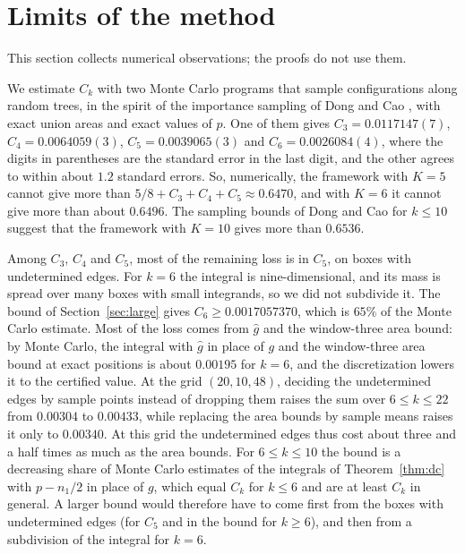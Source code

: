 \documentclass[11pt]{amsart}
\theoremstyle{definition}
\theoremstyle{remark}
\numberwithin{equation}{section}
\newcommand{\KmaxW}{22}
\newcommand{\WCsix}{0.0017057370}\newcommand{\WPctSix}{65}%
\newcommand{\Kmax}{\KmaxW}
\newcommand{\MCThree}{0.0117147}
\newcommand{\MCFour}{0.0064059}
\newcommand{\MCFive}{0.0039065}
\newcommand{\MCSix}{0.0026084}
\begin{document}
\section{Limits of the method}\label{sec:limits}

This section collects numerical observations; the proofs do not use them.

We estimate $C_k$ with two Monte Carlo programs that sample configurations along random trees, in the spirit of the importance sampling of Dong and Cao \cite[Section~3.4]{DC26}, with exact union areas and exact values of $p$. One of them gives $C_3=\MCThree(7)$, $C_4=\MCFour(3)$, $C_5=\MCFive(3)$ and $C_6=\MCSix(4)$, where the digits in parentheses are the standard error in the last digit, and the other agrees to within about $1.2$ standard errors. So, numerically, the framework with $K=5$ cannot give more than $5/8+C_3+C_4+C_5\approx0.6470$, and with $K=6$ it cannot give more than about $0.6496$. The sampling bounds of Dong and Cao for $k\le10$ \cite[Section~3.4]{DC26} suggest that the framework with $K=10$ gives more than $0.6536$.

Among $C_3$, $C_4$ and $C_5$, most of the remaining loss is in $C_5$, on boxes with undetermined edges. For $k=6$ the integral is nine-dimensional, and its mass is spread over many boxes with small integrands, so we did not subdivide it. The bound of Section~\ref{sec:large} gives $C_6\ge\WCsix$, which is $\WPctSix\%$ of the Monte Carlo estimate. Most of the loss comes from $\hat g$ and the window-three area bound: by Monte Carlo, the integral with $\hat g$ in place of $g$ and the window-three area bound at exact positions is about $0.00195$ for $k=6$, and the discretization lowers it to the certified value. At the grid $(20,10,48)$, deciding the undetermined edges by sample points instead of dropping them raises the sum over $6\le k\le\Kmax$ from $0.00304$ to $0.00433$, while replacing the area bounds by sample means raises it only to $0.00340$. At this grid the undetermined edges thus cost about three and a half times as much as the area bounds. For $6\le k\le10$ the bound is a decreasing share of Monte Carlo estimates of the integrals of Theorem~\ref{thm:dc} with $p-n_1/2$ in place of $g$, which equal $C_k$ for $k\le6$ and are at least $C_k$ in general. A larger bound would therefore have to come first from the boxes with undetermined edges (for $C_5$ and in the bound for $k\ge6$), and then from a subdivision of the integral for $k=6$.

\appendix
\end{document}
